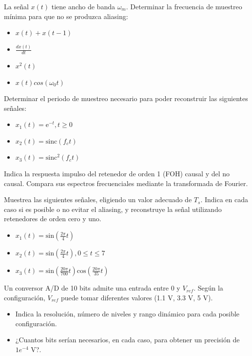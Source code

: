 \documentclass[10pt,twoside,spanish,a4paper]{article}
\begin{document}
\vspace{-8em}

	\begin{itemize}
		\itemP La señal $x(t)$ tiene ancho de banda $\omega_m$. Determinar la frecuencia de muestreo mínima para que no se produzca aliasing:
		\begin{itemize}
			\item $x(t) + x(t-1)$
			\item $\frac{dx(t)}{dt}$
			\item $x^2(t)$
			\item $x(t)cos(\omega_0 t)$
		\end{itemize}

		\itemP Determinar el periodo de muestreo necesario para poder reconstruir las siguientes señales:
		\begin{itemize}
			\item $x_1(t)=\mathrm{e}^{-t}, t \geq 0$
			\item $x_2(t)=\mathrm{sinc}(f_c t)$
			\item $x_3(t)=\mathrm{sinc}^2(f_c t)$
		\end{itemize}

		\itemP Indica la respuesta impulso del retenedor de orden 1 (FOH) causal y del no causal. Compara sus espectros frecuenciales mediante
		la transformada de Fourier.

		\itemP Muestrea las siguientes señales, eligiendo un valor adecuado de $T_s$. Indica en cada caso si es posible o no 
		evitar el aliasing, y reconstruye la señal utilizando retenedores de orden cero y uno.
		\begin{itemize}
			\item $x_1(t)=\mathrm{sin}(\frac{2\pi}{4} t)$
			\item $x_2(t)=\mathrm{sin}(\frac{2\pi}{4} t), 0\leq t\leq 7$
			\item $x_3(t)=\mathrm{sin}(\frac{20\pi}{700}t)\mathrm{cos}(\frac{20\pi}{35}t)$
		\end{itemize}

		\itemP Un conversor A/D de 10 bits admite una entrada entre 0 y $V_{ref}$. Según la configuración, $V_{ref}$ puede tomar diferentes valores (1.1 V, 3.3 V, 5 V).
		\begin{itemize}
			\item Indica la resolución, número de niveles y rango dinámico para cada posible configuración.
			\item ¿Cuantos bits serían necesarios, en cada caso, para obtener un precisión de $1e^{-4}$ V?.
		\end{itemize}

	\end{itemize}
\end{document}
